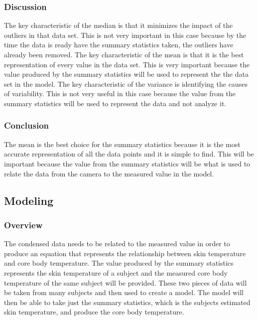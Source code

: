 		\subsubsection*{Discussion}
		
		The key characteristic of the median is that it minimizes the impact of the outliers in that data set. This is not very important in this case because by the time the data is ready have the summary statistics taken, the outliers have already been removed. The key characteristic of the mean is that it is the best representation of every value in the data set. This is very important because the value produced by the summary statistics will be used to represent the the data set in the model. The key characteristic of the variance is identifying the causes of variability. This is not very useful in this case because the value from the summary statistics will be used to represent the data and not analyze it.
	    

		\subsubsection*{Conclusion}
		
		The mean is the best choice for the summary statistics because it is the most accurate representation of all the data points and it is simple to find. This will be important because the value from the summary statistics will be what is used to relate the data from the camera to the measured value in the model.

	\subsection*{Modeling}
	
		\subsubsection*{Overview}
		The condensed data needs to be related to the measured value in order to produce an equation that represents the relationship between skin temperature and core body temperature. The value produced by the summary statistics represents the skin temperature of a subject and the measured core body temperature of the same subject will be provided. These two pieces of data will be taken from many subjects and then used to create a model. The model will then be able to take just the summary statistics, which is the subjects estimated skin temperature, and produce the core body temperature.

